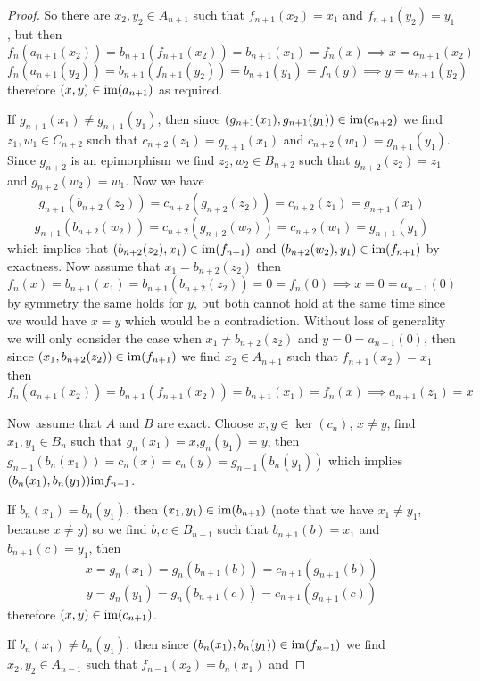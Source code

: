 \begin{proof}[Proof]
    So there are $x_2,y_2\in A_{n+1}$ such that 
    $f_{n+1}(x_2)=x_1$ and $f_{n+1}(y_2)=y_1$, but then 
    \[
        f_{n}(a_{n+1}(x_2)) = b_{n+1}(f_{n+1}(x_2)) = b_{n+1}(x_1) = f_n(x) \implies x=a_{n+1}(x_2)
    \] 
    \[
        f_{n}(a_{n+1}(y_2)) = b_{n+1}(f_{n+1}(y_2)) = b_{n+1}(y_1) = f_n(y) \implies y=a_{n+1}(y_2)
    \]
    therefore $(x,y)\in\text{im}(a_{n+1})$ as required.\par
    If $g_{n+1}(x_1)\neq g_{n+1}(y_1)$, then since $(g_{n+1}(x_1),g_{n+1}(y_1))\in\text{im}(c_{n+2})$ we find
    $z_1,w_1\in C_{n+2}$ such that $c_{n+2}(z_1)=g_{n+1}(x_1)$ and $c_{n+2}(w_1)=g_{n+1}(y_1)$. Since
    $g_{n+2}$ is an epimorphism we find $z_2,w_2\in B_{n+2}$ such that 
    $g_{n+2}(z_2)=z_1$ and $g_{n+2}(w_2)=w_1$. Now we have 
    \[
        g_{n+1}(b_{n+2}(z_2)) = c_{n+2}(g_{n+2}(z_2))=c_{n+2}(z_1)=g_{n+1}(x_1)
    \]
    \[
        g_{n+1}(b_{n+2}(w_2)) = c_{n+2}(g_{n+2}(w_2)) = c_{n+2}(w_1) = g_{n+1}(y_1)
    \]
    which implies that $(b_{n+2}(z_2),x_1)\in\text{im}(f_{n+1})$ and $(b_{n+2}(w_2),y_1)\in\text{im}(f_{n+1})$
    by exactness. Now assume that $x_1=b_{n+2}(z_2)$ then
    \[
        f_n(x)=b_{n+1}(x_1)= b_{n+1}(b_{n+2}(z_2)) = 0 = f_{n}(0) \implies x=0=a_{n+1}(0)
    \]
    by symmetry the same holds for $y$, but both cannot hold at the same time since we would have $x=y$ which would be a contradiction.
    Without loss of generality we will only consider the case when $x_1\neq b_{n+2}(z_2)$ and $y=0=a_{n+1}(0)$, then 
    since $(x_1,b_{n+2}(z_2))\in\text{im}(f_{n+1})$ we find $x_2\in A_{n+1}$ such that 
    $f_{n+1}(x_2)=x_1$
    then 
    \[
        f_{n}(a_{n+1}(x_2)) = b_{n+1}(f_{n+1}(x_2)) = b_{n+1}(x_1) = f_n(x) \implies a_{n+1}(z_1)=x
    \]\par
    Now assume that $A$ and $B$ are exact. Choose $x,y\in\ker(c_n)$, $x\neq y$, find $x_1,y_1\in B_n$ such that 
    $g_n(x_1)=x$,$g_n(y_1)=y$, then $g_{n-1}(b_n(x_1))=c_n(x)=c_n(y)=g_{n-1}(b_n(y_1))$
    which implies $(b_n(x_1),b_n(y_1))\text{im} f_{n-1}$.\par
    If $b_n(x_1)=b_n(y_1)$, then $(x_1,y_1)\in\text{im}(b_{n+1})$ (note that 
    we have $x_1\neq y_1$, because $x\neq y$) so we find $b,c\in B_{n+1}$ 
    such that $b_{n+1}(b) = x_1$ and $b_{n+1}(c)=y_1$, then 
    \[
        x = g_n(x_1) = g_n(b_{n+1}(b)) = c_{n+1}(g_{n+1}(b))
    \] 
    \[
        y = g_n(y_1) = g_n(b_{n+1}(c)) = c_{n+1}(g_{n+1}(c)) 
    \]
    therefore $(x,y)\in\text{im}(c_{n+1})$.\par
    If $b_n(x_1)\neq b_n(y_1)$, then since $(b_n(x_1),b_n(y_1))\in\text{im}(f_{n-1})$
    we find $x_2,y_2\in A_{n-1}$ such that $f_{n-1}(x_2)=b_n(x_1)$ and 

\end{proof}
